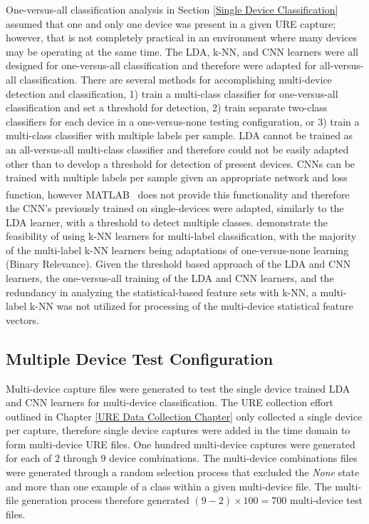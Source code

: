 One-versus-all classification analysis in Section \ref{Single Device Classification} assumed that one and only one device was present in a given URE capture; however, that is not completely practical in an environment where many devices may be operating at the same time.  The LDA, k-NN, and CNN learners were all designed for one-versus-all classification and therefore were adapted for all-versus-all classification.  There are several methods for accomplishing multi-device detection and classification, 1) train a multi-class classifier for one-versus-all classification and set a threshold for detection, 2) train separate two-class classifiers for each device in a one-versus-none testing configuration, or 3) train a multi-class classifier with multiple labels per sample.  LDA cannot be trained as an all-versus-all multi-class classifier and therefore could not be easily adapted other than to develop a threshold for detection of present devices.  CNNs can be trained with multiple labels per sample given an appropriate network and loss function, however MATLAB\textsuperscript \textregistered ~ does not provide this functionality and therefore the CNN's previously trained on single-devices were adapted, similarly to the LDA learner, with a threshold to detect multiple classes.  \cite{Sorower2010, Zhang2007, Spyromitros2008} demonstrate the feasibility of using k-NN learners for multi-label classification, with the majority of the multi-label k-NN learners being adaptations of one-versus-none learning (Binary Relevance).  Given the threshold based approach of the LDA and CNN learners, the one-versus-all training of the LDA and CNN learners, and the redundancy in analyzing the statistical-based feature sets with k-NN, a multi-label k-NN was not utilized for processing of the multi-device statistical feature vectors. 

\subsection[Multiple Device Test Configuration]{Multiple Device Test Configuration}

Multi-device capture files were generated to test the single device trained LDA and CNN learners for multi-device classification.  The URE collection effort outlined in Chapter \ref{URE Data Collection Chapter} only collected a single device per capture, therefore single device captures were added in the time domain to form multi-device URE files.  One hundred multi-device captures were generated for each of $2$ through $9$ device combinations.  The multi-device combinations files were generated through a random selection process that excluded the \textit{None} state and more than one example of a class within a given multi-device file.  The multi-file generation process therefore generated $(9-2) \times 100 = 700$ multi-device test files.

